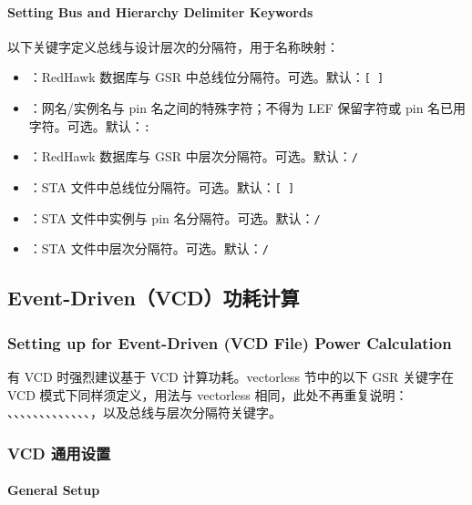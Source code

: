\paragraph*{Setting Bus and Hierarchy Delimiter Keywords}

以下关键字定义总线与设计层次的分隔符，用于名称映射：
\begin{itemize}
  \item {}：RedHawk 数据库与 GSR 中总线位分隔符。可选。默认：\texttt{[ ]}
  \item {}：网名/实例名与 pin 名之间的特殊字符；不得为 LEF 保留字符或 pin 名已用字符。可选。默认：\texttt{:}
  \item {}：RedHawk 数据库与 GSR 中层次分隔符。可选。默认：\texttt{/}
  \item {}：STA 文件中总线位分隔符。可选。默认：\texttt{[ ]}
  \item {}：STA 文件中实例与 pin 名分隔符。可选。默认：\texttt{/}
  \item {}：STA 文件中层次分隔符。可选。默认：\texttt{/}
\end{itemize}

\subsection{Event-Driven（VCD）功耗计算}
\subsubsection*{Setting up for Event-Driven (VCD File) Power Calculation}

有 VCD 时强烈建议基于 VCD 计算功耗。vectorless 节中的以下 GSR 关键字在 VCD 模式下同样须定义，用法与 vectorless 相同，此处不再重复说明：
、、、、、、、、、、、、、，以及总线与层次分隔符关键字。

\subsubsection{VCD 通用设置}
\paragraph*{General Setup}

